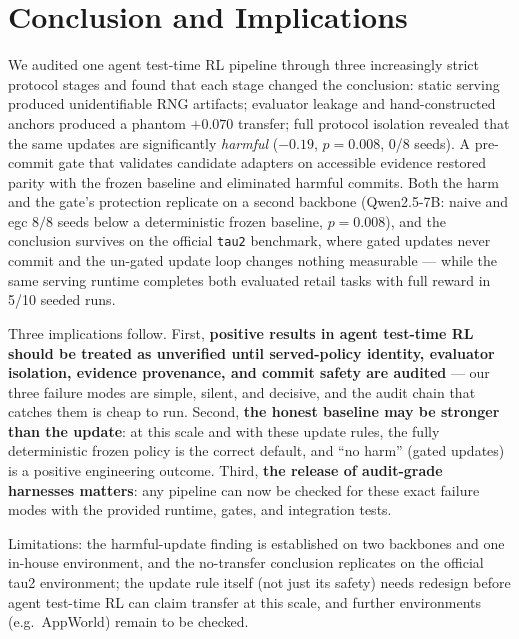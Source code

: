 \section{Conclusion and Implications}
We audited one agent test-time RL pipeline through three increasingly
strict protocol stages and found that each stage changed the
conclusion: static serving produced unidentifiable RNG artifacts;
evaluator leakage and hand-constructed anchors produced a phantom
$+0.070$ transfer; full protocol isolation revealed that the same
updates are significantly \emph{harmful} ($-0.19$, $p{=}0.008$, 0/8
seeds). A pre-commit gate that validates candidate adapters on
accessible evidence restored parity with the frozen baseline and
eliminated harmful commits. Both the harm and the gate's protection
replicate on a second backbone (Qwen2.5-7B: naive and egc $8/8$ seeds
below a deterministic frozen baseline, $p{=}0.008$), and the
conclusion survives on the official \texttt{tau2} benchmark, where
gated updates never commit and the un-gated update loop changes
nothing measurable --- while the same serving runtime completes both
evaluated retail tasks with full reward in 5/10 seeded runs.

Three implications follow. First, \textbf{positive results in agent
test-time RL should be treated as unverified until served-policy
identity, evaluator isolation, evidence provenance, and commit safety
are audited} --- our three failure modes are simple, silent, and
decisive, and the audit chain that catches them is cheap to run.
Second, \textbf{the honest baseline may be stronger than the update}:
at this scale and with these update rules, the fully deterministic
frozen policy is the correct default, and ``no harm'' (gated updates)
is a positive engineering outcome. Third, \textbf{the release of
audit-grade harnesses matters}: any pipeline can now be checked for
these exact failure modes with the provided runtime, gates, and
integration tests.

Limitations: the harmful-update finding is established on two backbones
and one in-house environment, and the no-transfer conclusion replicates
on the official tau2 environment; the update rule itself (not just its
safety) needs redesign before agent test-time RL can claim transfer at
this scale, and further environments (e.g.\ AppWorld) remain to be
checked.
